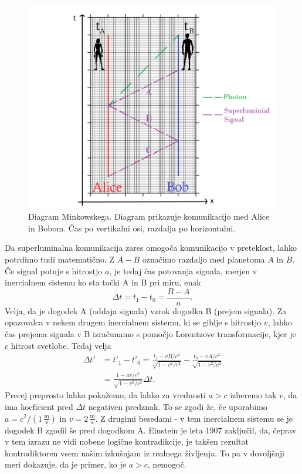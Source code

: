 \documentclass[12pt]{article}
\begin{document}
\begin{figure}[h]
\includegraphics[width=12cm]{special-relativity.png}
\centering
\caption{Diagram Minkowskega. Diagram prikazuje komunikacijo med Alice in Bobom. Čas po vertikalni osi, razdalja po horizontalni. \cite{marcocerezoEntanglementHowIt2015}}
\label{fig:minkowski}
\end{figure}

\par
Da superluminalna komunikacija zares omogoča komunikacijo v preteklost, lahko potrdimo tudi matematično. Z $A - B$ označimo razdaljo med planetoma $A$ in $B$. Če signal potuje s hitrostjo $a$, je tedaj čas potovanja signala, merjen v inercialnem sistemu ko sta točki A in B pri miru, enak 
\begin{equation} \label{eq2}
\Delta t=t_{1}-t_{0}=\frac{B-A}{a}.
\end{equation}
Velja, da je dogodek A (oddaja signala) vzrok dogodka B (prejem signala). Za opazovalca v nekem drugem inercialnem sistemu, ki se giblje s hitrostjo $v$, lahko čas prejema signala v B izračunamo s pomočjo Lorentzove transformacije, kjer je $c$ hitrost svetlobe. Tedaj velja 
\begin{equation} \label{eq3}
\begin{split}
\Delta t' & =t'_{1}-t'_{0}=\frac{t_{1}-vB/c^{2}}{\sqrt{1-v^{2}/c^{2}}}-\frac{t_{0}-vA/c^{2}}{\sqrt{1-v^{2}/c^{2}}}\\
 & =\frac{1-av/c^{2}}{\sqrt{1-v^{2}/c^{2}}}\Delta t.
\end{split}
\end{equation}
Precej preprosto lahko pokažemo, da lahko za vrednosti $a > c$ izberemo tak $v$, da ima koeficient pred $\Delta t$ negativen predznak. To se zgodi že, če uporabimo $a = c^2 / (1 \, \frac{\text{m}}{\text{s}}) $ in $v = 2 \, \frac{\text{m}}{\text{s}}$. Z drugimi besedami - v tem inercialnem sistemu se je dogodek B zgodil še pred dogodkom A. Einstein je leta 1907 zaključil, da, čeprav v tem izrazu ne vidi nobene logične kontradikcije, je takšen rezultat kontradiktoren vsem našim izkušnjam iz realnega življenja. To pa v dovoljšnji meri dokazuje, da je primer, ko je $a > c$, nemogoč. \cite{TachyonicAntitelephone2022a}
\end{document}
